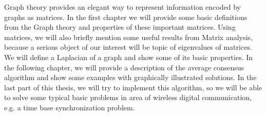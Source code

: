 Graph theory provides an elegant way to represent information encoded by graphs as matrices. In the first chapter we will provide some basic definitions from the Graph theory and properties of these important matrices. Using matrices, we will also briefly mention some  useful results from Matrix analysis, because a serious object of our interest will be topic of eigenvalues of matrices. We will define a Laplacian of a graph and show some of its basic properties. In the following chapter, we will provide a description of the average consensus algorithm and show some examples with graphically illustrated solutions. In the last part of this thesis, we will try to implement this algorithm, so we will be able to solve some typical basic problems in area of wireless digital communication, e.g. a time base synchronization problem. %


